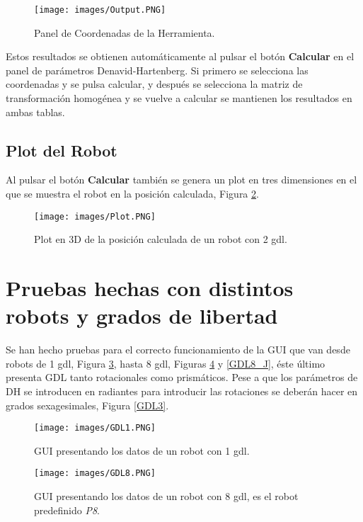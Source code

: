 \documentclass[a4paper, fontsize=11pt]{scrartcl} %
\numberwithin{equation}{section} %
\numberwithin{figure}{section} %
\numberwithin{table}{section} %
\begin{document}
	\begin{figure}[h!]
		\centering
		\texttt{[image: images/Output.PNG]}
		\caption{Panel de Coordenadas de la Herramienta.}
		\label{Output}
	\end{figure}
	\FloatBarrier
	
	Estos resultados se obtienen automáticamente al pulsar el botón \textbf{Calcular} en el panel de parámetros Denavid-Hartenberg. Si primero se selecciona las coordenadas y se pulsa calcular, y después se selecciona la matriz de transformación homogénea y se vuelve a calcular se mantienen los resultados en ambas tablas.\\
	
	\subsection{Plot del Robot}
	
	Al pulsar el botón \textbf{Calcular} también se genera un plot en tres dimensiones en el que se muestra el robot en la posición calculada, Figura \ref{Plot}.
	
	\begin{figure}[h!]
		\centering
		\texttt{[image: images/Plot.PNG]}
		\caption{Plot en 3D de la posición calculada de un robot con 2 gdl.}
		\label{Plot}
	\end{figure}
	\FloatBarrier
	
	\section{Pruebas hechas con distintos robots y grados de libertad}
	
	Se han hecho pruebas para el correcto funcionamiento de la GUI que van desde robots de 1 gdl, Figura \ref{GDL1}, hasta 8 gdl, Figuras \ref{GDL8} y \ref{GDL8_J}, éste último presenta GDL tanto rotacionales como prismáticos. Pese a que los parámetros de DH se introducen en radiantes para introducir las rotaciones se deberán hacer en grados sexagesimales, Figura \ref{GDL3}.
	
	\begin{figure}[h!]
		\centering
		\texttt{[image: images/GDL1.PNG]}
		\caption{GUI presentando los datos de un robot con 1 gdl.}
		\label{GDL1}
	\end{figure}
	\FloatBarrier
	
	\begin{figure}[h!]
		\centering
		\texttt{[image: images/GDL8.PNG]}
		\caption{GUI presentando los datos de un robot con 8 gdl, es el robot predefinido \textit{P8}.}
		\label{GDL8}
	\end{figure}
	\FloatBarrier
	
\end{document}
